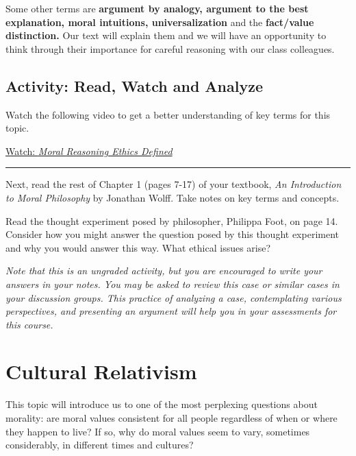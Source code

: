 \documentclass[
]{book}
\begin{document}
Some other terms are \textbf{argument by analogy, argument to the best explanation, moral intuitions, universalization} and the \textbf{fact/value distinction.} Our text will explain them and we will have an opportunity to think through their importance for careful reasoning with our class colleagues.

\hypertarget{activity-read-watch-and-analyze}{%
\subsection*{Activity: Read, Watch and Analyze}\label{activity-read-watch-and-analyze}}

\begin{reflect}
Watch the following video to get a better understanding of key terms for this topic.

\href{https://www.youtube.com/watch?v=h_sufC5nY18}{Watch: \emph{Moral Reasoning \textbar{} Ethics Defined}}

\begin{center}\rule{0.5\linewidth}{0.5pt}\end{center}

Next, read the rest of Chapter 1 (pages 7-17) of your textbook, \emph{An Introduction to Moral Philosophy} by Jonathan Wolff. Take notes on key terms and concepts.

Read the thought experiment posed by philosopher, Philippa Foot, on page 14. Consider how you might answer the question posed by this thought experiment and why you would answer this way. What ethical issues arise?

\emph{Note that this is an ungraded activity, but you are encouraged to write your answers in your notes. You may be asked to review this case or similar cases in your discussion groups. This practice of analyzing a case, contemplating various perspectives, and presenting an argument will help you in your assessments for this course.}
\end{reflect}

\hypertarget{cultural-relativism}{%
\section{Cultural Relativism}\label{cultural-relativism}}

This topic will introduce us to one of the most perplexing questions about morality: are moral values consistent for all people regardless of when or where they happen to live? If so, why do moral values seem to vary, sometimes considerably, in different times and cultures?
\end{document}
